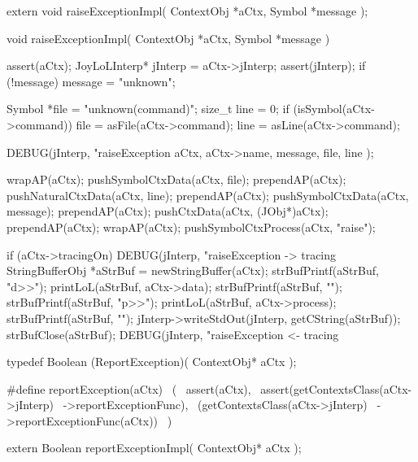 \startCHeader
extern void raiseExceptionImpl(
  ContextObj *aCtx,
  Symbol     *message
);
\stopCHeader
{}

\startCCode
void raiseExceptionImpl(
  ContextObj *aCtx,
  Symbol     *message
) {
  assert(aCtx);
  JoyLoLInterp* jInterp = aCtx->jInterp;
  assert(jInterp);
  if (!message) message = "unknown";

  Symbol *file = "unknown(command)";
  size_t  line = 0;
  if (isSymbol(aCtx->command)) {
    file = asFile(aCtx->command);
    line = asLine(aCtx->command);
  }

  DEBUG(jInterp, "raiseException %
    aCtx, aCtx->name, message, file, line
  );

  wrapAP(aCtx);
  pushSymbolCtxData(aCtx, file);
  prependAP(aCtx);
  pushNaturalCtxData(aCtx, line);
  prependAP(aCtx);
  pushSymbolCtxData(aCtx, message);
  prependAP(aCtx);
  pushCtxData(aCtx, (JObj*)aCtx);
  prependAP(aCtx);
  wrapAP(aCtx);
  pushSymbolCtxProcess(aCtx, "raise");
  
  if (aCtx->tracingOn) {
    DEBUG(jInterp, "raiseException -> tracing%
    StringBufferObj *aStrBuf = newStringBuffer(aCtx);
    strBufPrintf(aStrBuf, "d>>");
    printLoL(aStrBuf, aCtx->data);
    strBufPrintf(aStrBuf, "\n");
    strBufPrintf(aStrBuf, "p>>");
    printLoL(aStrBuf, aCtx->process);
    strBufPrintf(aStrBuf, "\n");
    jInterp->writeStdOut(jInterp, getCString(aStrBuf));
    strBufClose(aStrBuf);
    DEBUG(jInterp, "raiseException <- tracing%
  }
}
\stopCCode

\startCHeader
typedef Boolean (ReportException)(
  ContextObj* aCtx
);

#define reportException(aCtx)               \
  (                                         \
    assert(aCtx),                           \
    assert(getContextsClass(aCtx->jInterp)  \
      ->reportExceptionFunc),               \
    (getContextsClass(aCtx->jInterp)        \
      ->reportExceptionFunc(aCtx))          \
  )
\stopCHeader

\setCHeaderStream{private}
\startCHeader
extern Boolean reportExceptionImpl(
  ContextObj* aCtx
);
\stopCHeader
{}


